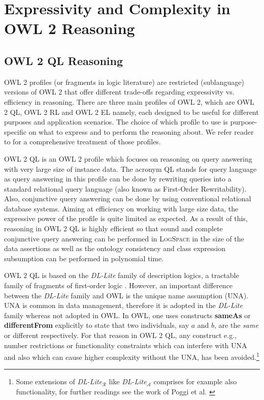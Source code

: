 \documentclass{llncs}
\begin{document}
\section{Expressivity and Complexity in OWL 2 Reasoning}

\subsection{OWL 2 QL Reasoning}

OWL 2 profiles (or fragments in logic literature) are restricted (sublanguage) versions of OWL 2 that offer different trade-offs regarding expressivity  vs. efficiency in reasoning. There are three main  profiles of OWL 2, which are OWL 2 QL, OWL 2 RL and OWL 2 EL namely, each designed to  be useful for different purposes and application scenarios. The choice of which profile to use is purpose-specific on what to express and to perform the reasoning about. We refer reader to \cite{owl2profiles2008} for a comprehensive treatment of those profiles. 

OWL 2 QL is an OWL 2 profile which focuses on reasoning on query answering with very large size of instance data. The acronym QL stands for query language as query answering in this profile can be done by rewriting queries into a standard relational query language (also known as First-Order Rewritability). Also, conjunctive query answering can be done by using conventional relational database systems. Aiming at efficiency on working with large size data, the expressive power of the profile is quite limited as expected. As a result of this, reasoning in OWL 2 QL is highly efficient so that sound and complete conjunctive query answering can be performed in \textsc{LogSpace} in the size of the data assertions as well as  the ontology consistency and class expression subsumption can be performed in polynomial time.

OWL 2 QL is based on the \textit{DL-Lite} family of description logics, a tractable family of fragments of first-order logic \cite{Artale2009,Calvanese2007}. 
However, an important difference between the \textit{DL-Lite} family and OWL is the
unique name assumption (UNA). UNA is common in data management, therefore it is adopted in the \textit{DL-Lite} family whereas not adopted in OWL. In OWL, one uses constructs \textbf{sameAs} or \textbf{differentFrom} explicitly to state that two individuals, say  $a$ and $b$, are the \emph{same} or {different} respectively. For that reason in OWL 2 QL, any construct e.g., number restrictions or functionality constraints which can interfere with UNA and also which can cause higher complexity without the UNA, has been avoided.\footnote{Some extensions of \textit{DL-Lite}$_\mathcal{R}$ like \textit{DL-Lite}$_\mathcal{A}$ comprises for example also functionality, for further readings see the work of Poggi et al. \cite{poggi2008linking}}
\end{document}
